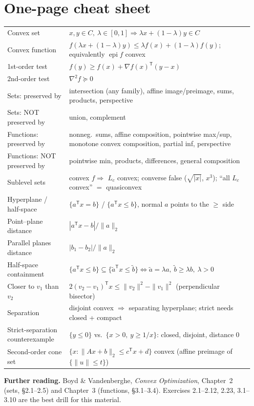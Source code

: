\documentclass[11pt]{article}
\newcommand{\T}{^{\mathsf T}}
\newcommand{\lam}{\lambda}
\newcommand{\epi}{\operatorname{epi}}
\theoremstyle{definition}
\theoremstyle{plain}
\theoremstyle{remark}
\begin{document}
\section{One-page cheat sheet}
\begin{center}\renewcommand{\arraystretch}{1.25}
\begin{tabular}{@{}>{\raggedright}p{}p{}@{}}\toprule
Convex set & $x,y\in C,\ \lam\in[0,1]\Rightarrow\lam x+(1-\lam)y\in C$ \\
Convex function & $f(\lam x+(1-\lam)y)\le\lam f(x)+(1-\lam)f(y)$; equivalently $\epi f$ convex \\
1st-order test & $f(y)\ge f(x)+\nabla f(x)\T(y-x)$ \\
2nd-order test & $\nabla^2f\succeq0$ \\
Sets: preserved by & intersection (any family), affine image/preimage, sums, products, perspective \\
Sets: NOT preserved by & union, complement \\
Functions: preserved by & nonneg.\ sums, affine composition, pointwise max/sup, monotone convex composition, partial inf, perspective \\
Functions: NOT preserved by & pointwise min, products, differences, general composition \\
Sublevel sets & convex $f\Rightarrow$ $L_c$ convex; converse false ($\sqrt{|x|}$, $x^3$); ``all $L_c$ convex'' $=$ quasiconvex \\
Hyperplane / half-space & $\{a\T x=b\}$ / $\{a\T x\le b\}$, normal $a$ points to the $\ge$ side \\
Point--plane distance & $|a\T x-b|/\|a\|_2$ \\
Parallel planes distance & $|b_1-b_2|/\|a\|_2$ \\
Half-space containment & $\{a\T x\le b\}\subseteq\{\tilde a\T x\le\tilde b\}\iff\tilde a=\lam a,\ \tilde b\ge\lam b,\ \lam>0$ \\
Closer to $v_1$ than $v_2$ & $2(v_2-v_1)\T x\le\|v_2\|^2-\|v_1\|^2$ (perpendicular bisector) \\
Separation & disjoint convex $\Rightarrow$ separating hyperplane; strict needs closed + compact \\
Strict-separation counterexample & $\{y\le0\}$ vs.\ $\{x>0,\ y\ge1/x\}$: closed, disjoint, distance $0$ \\
Second-order cone set & $\{x:\|Ax+b\|_2\le c\T x+d\}$ convex (affine preimage of $\{\|u\|\le t\}$) \\ \bottomrule
\end{tabular}\end{center}

\bigskip\noindent\textbf{Further reading.} Boyd \& Vandenberghe, \emph{Convex Optimization}, Chapter~2 (sets, \S2.1--2.5) and Chapter~3 (functions, \S3.1--3.4). Exercises 2.1--2.12, 2.23, 3.1--3.10 are the best drill for this material.
\end{document}
